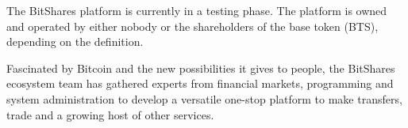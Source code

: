 The BitShares platform is currently in a testing phase. The
platform is owned and operated by either nobody or the shareholders of the base
token (BTS), depending on the definition.

Fascinated by Bitcoin and the new possibilities it gives to people, the
BitShares ecosystem team has gathered experts from financial markets,
programming and system administration to develop a versatile one-stop platform
to make transfers, trade and a growing host of other services. 
